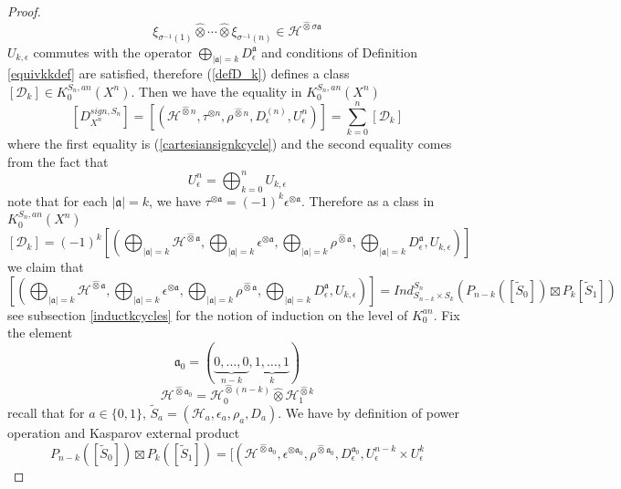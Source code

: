 \documentclass[11pt,leqno,twoside]{amsart}
\theoremstyle{plainsl}
\theoremstyle{definition}
\newcommand{\cD}{\mathcal{D}}
\newcommand{\cH}{\mathcal{H}}
\begin{document}
\begin{proof}
\begin{equation}
    \xi_{\sigma^{-1}(1)}\widehat{\otimes}
    \cdots\widehat{\otimes}
    \xi_{\sigma^{-1}(n)}\in \cH^{\widehat{\otimes}\sigma\mathfrak{ a}}
    \end{equation}
$U_{k,\epsilon}$ commutes with the operator $\bigoplus_{{|\mathfrak{a}|=k}}D_{\epsilon}^{\mathfrak{a}}$ and conditions of Definition \ref{equivkkdef} are satisfied, therefore (\ref{defD_k}) defines a class $[\cD_k]\in K^{S_n,an}_0(X^n)$. Then we have the equality in $K^{S_n,an}_0(X^n)$
\[\left[D^{sign,S_n}_{X^n}\right]=\left[(\mathcal{H}^{\widehat{\otimes}n},
\tau^{\otimes n},\rho^{\widehat{\otimes}n}_{},
D_{\epsilon}^{(n)},U^n_{\epsilon})\right]=\sum^n_{k=0} [\cD_k]\]
where the first equality is (\ref{cartesiansignkcycle}) and the second equality comes from the fact that
\[U^n_{\epsilon}=\bigoplus^n_{k=0}U_{k,\epsilon}\]
note that for each $|\mathfrak{a}|=k$, we have $\tau^{{\otimes}\mathfrak{a}}=(-1)^k \epsilon^{{\otimes}\mathfrak{a}}$. Therefore
 as a class in $K^{S_n,an}_0(X^n)$
\[[\cD_k]=(-1)^k\left[ (\bigoplus_{{|\mathfrak{a}|=k}} \cH^{\widehat{\otimes}\mathfrak{a}},\bigoplus_{{|\mathfrak{a}|=k}} \epsilon^{{\otimes}\mathfrak{a}},\bigoplus_{{|\mathfrak{a}|=k}} \rho^{\widehat{\otimes}\mathfrak{a}},\bigoplus_{{|\mathfrak{a}|=k}}D_{\epsilon}^{\mathfrak{a}}, U_{k,\epsilon})\right]\]
we claim that
\begin{equation}\label{induecdk}
  \left[ (\bigoplus_{{|\mathfrak{a}|=k}} \cH^{\widehat{\otimes}\mathfrak{a}},\bigoplus_{{|\mathfrak{a}|=k}} \epsilon^{{\otimes}\mathfrak{a}},\bigoplus_{{|\mathfrak{a}|=k}} \rho^{\widehat{\otimes}\mathfrak{a}},\bigoplus_{{|\mathfrak{a}|=k}}D_{\epsilon}^{\mathfrak{a}}, U_{k,\epsilon})\right]=Ind_{S_{n-k}\times S_k}^{S_n}(P_{n-k}([\widetilde S_{0}])\boxtimes P_{k}[\widetilde S_{1}])
\end{equation}
see subsection \ref{inductkcycles} for the notion of induction on the level of $K^{an}_0$. Fix the element
\[
\mathfrak a_0=
(\underbrace{0,\ldots,0}_{n-k},
\underbrace{1,\ldots,1}_{k})
\]
\[
\mathcal H^{\widehat\otimes\mathfrak a_0}
=
\mathcal H_0^{\widehat\otimes(n-k)}
\widehat\otimes
\mathcal H_1^{\widehat\otimes k}
\]
recall that for $a\in \{0,1\}$, $\widetilde S_a=(\mathcal H_a,\epsilon_a,\rho_a,D_a)$. We have by definition of power operation and Kasparov external product
\begin{equation}\label{poweropn-k,k}
    P_{n-k}([\widetilde S_0])
\boxtimes P_k([\widetilde S_1])=[\left(
\mathcal H^{\widehat\otimes\mathfrak a_0},\epsilon^{\otimes\mathfrak a_0},
\rho^{\widehat\otimes\mathfrak a_0},
D_\epsilon^{\mathfrak a_0},
U^{n-k}_{\epsilon}\times U^{k}_{\epsilon}

\end{equation}
\end{proof}
\end{document}
